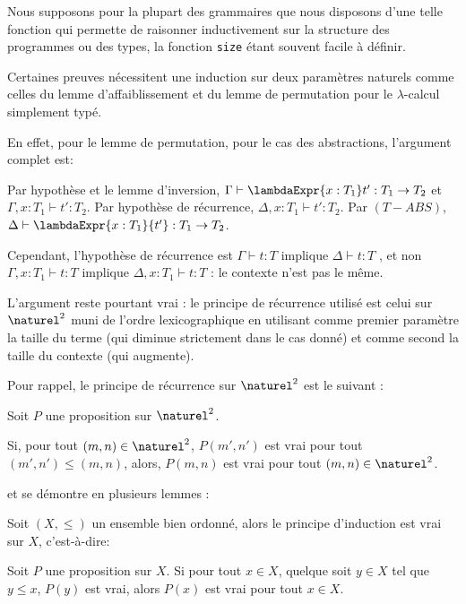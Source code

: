 Nous supposons pour la plupart des grammaires que nous disposons d'une telle
fonction qui permette de raisonner inductivement sur la structure des
programmes ou des types, la fonction \verb|size| étant souvent facile à définir.

Certaines preuves nécessitent une induction sur deux paramètres naturels comme celles
du lemme d'affaiblissement et du lemme de permutation pour le $\lambda$-calcul
simplement typé.

En effet, pour le lemme de permutation, pour le cas des abstractions, l'argument
complet est:

\og Par hypothèse et le lemme d'inversion, $\Gamma \vdash \lambdaExpr{x : T_{1}}
t' : T_{1} \rightarrow T_{2}$ et $\Gamma, x : T_{1} \vdash t' : T_{2}$. Par
hypothèse de récurrence, $\Delta, x : T_{1} \vdash t' : T_{2}$. Par $(T-ABS)$,
$\Delta \vdash \lambdaExpr{x : T_{1}}{t'} : T_{1} \rightarrow T_{2}$. \fg

Cependant, l'hypothèse de récurrence est \og $\Gamma \vdash t : T$ implique $\Delta
\vdash t : T$ \fg, et non \og $\Gamma, x : T_{1} \vdash t : T$ implique $\Delta, x :
T_{1} \vdash t : T$ \fg : le contexte n'est pas le même.

L'argument reste pourtant vrai : le principe de récurrence utilisé est celui sur
$\naturel^{2}$ muni de l'ordre lexicographique en utilisant comme premier
paramètre la taille du terme (qui diminue strictement dans le cas donné) et
comme second la taille du contexte (qui augmente).

Pour rappel, le principe de récurrence sur $\naturel^{2}$ est le suivant :
\begin{proposition}
  Soit $P$ une proposition sur $\naturel^{2}$.

  Si, pour tout $(m, n) \in \naturel^{2}$, $P(m', n')$ est vrai pour tout $(m',
  n') \leq (m, n)$, alors, $P(m, n)$ est vrai pour tout $(m, n) \in \naturel^{2}$.
\end{proposition}

et se démontre en plusieurs lemmes :

\begin{lemma} 
  Soit $(X, \leq)$ un ensemble bien ordonné, alors le principe d'induction est
  vrai sur $X$, c'est-à-dire:

  Soit $P$ une proposition sur $X$.
  Si pour tout $x \in X$, quelque soit $y \in X$ tel que $y \leq x$, $P(y)$ est
  vrai, alors $P(x)$ est vrai pour tout $x \in X$.
\end{lemma}

